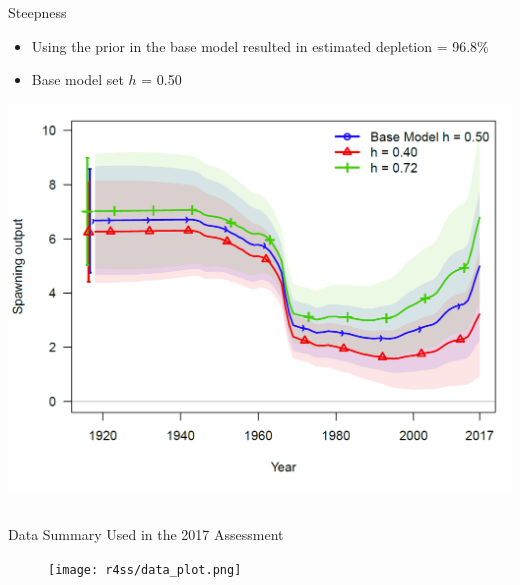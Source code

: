 \documentclass[pdf]{beamer}\usepackage[]{graphicx}\usepackage[]{color}
\begin{document}
\begin{frame}{Steepness}
  \begin{itemize}
    \item Using the prior in the base model resulted in estimated depletion = 96.8\%
    \item Base model set $h$ = 0.50
  \end{itemize}
    \begin{center}
    \includegraphics[scale = 0.22]{figures/Alternative_Steepness_Values.png}
  \end{center}
\end{frame}

\subsection{}
\begin{frame}{Data Summary Used in the 2017 Assessment}
  \begin{figure}[ht]
    \begin{center}
      \texttt{[image: r4ss/data\_plot.png]}

    \end{center}
  \end{figure}
\end{frame}
\end{document}
